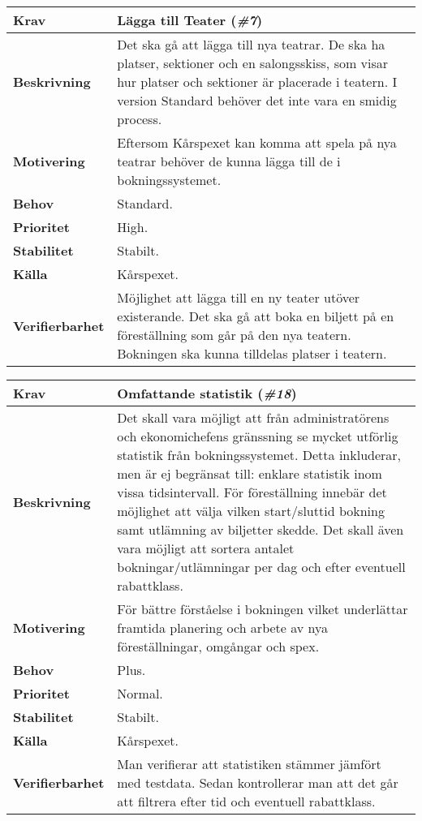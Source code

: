 \documentclass[a4paper, twoside, 11pt, titlepage]{article}
\begin{document}
		\begin{tabular} { p{2.6cm} p{12.5cm} }
			\hline
			\sffamily\textbf{Krav} & Lägga till Teater (\emph{\#7})  \\
			\hline
			\sffamily\textbf{Beskrivning} & Det ska gå att lägga till nya teatrar. De ska ha platser, sektioner och en salongsskiss, som visar hur platser och sektioner är placerade i teatern. I version Standard behöver det inte vara en smidig process.  \\
			\hline
			\sffamily\textbf{Motivering} & Eftersom Kårspexet kan komma att spela på nya teatrar behöver de kunna lägga till de i bokningssystemet.  \\
			\hline
			\sffamily\textbf{Behov} & Standard.  \\
			\hline
			\sffamily\textbf{Prioritet} & High.  \\
			\hline
			\sffamily\textbf{Stabilitet} & Stabilt.  \\
			\hline
			\sffamily\textbf{Källa} & Kårspexet.  \\
			\hline
			\sffamily\textbf{Verifierbarhet} & Möjlighet att lägga till en ny teater utöver existerande. Det ska gå att boka en biljett på en föreställning som går på den nya teatern. Bokningen ska kunna tilldelas platser i teatern.  \\
			\hline
		\end{tabular}
		\vspace{6mm}

		\begin{tabular} { p{2.6cm} p{12.5cm} }
			\hline
			\sffamily\textbf{Krav} & Omfattande statistik (\emph{\#18})  \\
			\hline
			\sffamily\textbf{Beskrivning} & Det skall vara möjligt att från administratörens och ekonomichefens gränssning se mycket utförlig statistik från bokningssystemet. Detta inkluderar, men är ej begränsat till: enklare statistik inom vissa tidsintervall. För föreställning innebär det möjlighet att välja vilken start/sluttid bokning samt utlämning av biljetter skedde. Det skall även vara möjligt att sortera antalet bokningar/utlämningar per dag och efter eventuell rabattklass.  \\
			\hline
			\sffamily\textbf{Motivering} & För bättre förståelse i bokningen vilket underlättar framtida planering och arbete av nya föreställningar, omgångar och spex.  \\
			\hline
			\sffamily\textbf{Behov} & Plus.  \\
			\hline
			\sffamily\textbf{Prioritet} & Normal.  \\
			\hline
			\sffamily\textbf{Stabilitet} & Stabilt.  \\
			\hline
			\sffamily\textbf{Källa} & Kårspexet.  \\
			\hline
			\sffamily\textbf{Verifierbarhet} & Man verifierar att statistiken stämmer jämfört med testdata. Sedan kontrollerar man att det går att filtrera efter tid och eventuell rabattklass.  \\
			\hline
		\end{tabular}
		\vspace{6mm}
\end{document}
